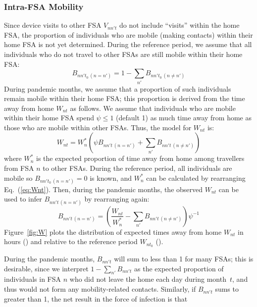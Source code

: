 \subsubsection{Intra-FSA Mobility}\label{app.mob.intra}
Since device visits to other FSA $V_{nn't}$ do not include ``visits'' within the home FSA,
the proportion of individuals who are mobile (making contacts) within their home FSA is not yet determined.
During the reference period, we assume that
all individuals who do not travel to other FSAs are still mobile within their home FSA:
\begin{equation}\label{eq:Bnnt.intra.t0}
  B_{nn't_0\,(n = n')} = 1 - \sum_{n'} B_{nn't_0\,(n \ne n')}
\end{equation}
During pandemic months, we assume that
a proportion of such individuals remain mobile within their home FSA;
this proportion is derived from the time away from home $W_{nt}$ as follows.
We assume that individuals who are mobile within their home FSA
spend $\psi \le 1$ (default 1) as much time away from home as
those who are mobile within other FSAs.
Thus, the model for $W_{nt}$ is:
\begin{equation}\label{eq:Wnt}
  W_{nt} = W^*_n \left(\psi B_{nn't\,(n = n')} + \sum_{n'} B_{nn't\,(n \ne n')} \right)
\end{equation}
where $W^*_n$ is the expected proportion of time away from home
among travellers from FSA $n$ to other FSAs.
During the reference period, all individuals are mobile so $B_{nn't_0\,(n = n')} = 0$ is known, and
$W^*_n$ can be calculated by rearranging Eq.~(\ref{eq:Wnt}).
Then, during the pandemic months, the observed $W_{nt}$ can be used to infer $B_{nn't\,(n = n')}$
by rearranging again:
\begin{equation}\label{eq:Bnnt.intra.t}
  B_{nn't\,(n = n')} = \left(\frac{W_{nt}}{W^*_n} - \sum_{n'} B_{nn't\,(n \ne n')}\right) \psi^{-1}
\end{equation}
Figure~\ref{fig:W} plots the distribution of expected times away from home $W_{nt}$
in hours () and relative to the reference period $W_{nt_0}$ ().
\par
During the pandemic months, $B_{nn't}$ will sum to less than 1 for many FSAs;
this is desirable, since we interpret $1 - \sum_{n'} B_{nn't}$ as
the expected proportion of individuals in FSA $n$
who did not leave the home each day during month~$t$,
and thus would not form any mobility-related contacts.
Similarly, if $B_{nn't}$ sums to greater than 1, the net result in the force of infection is that
